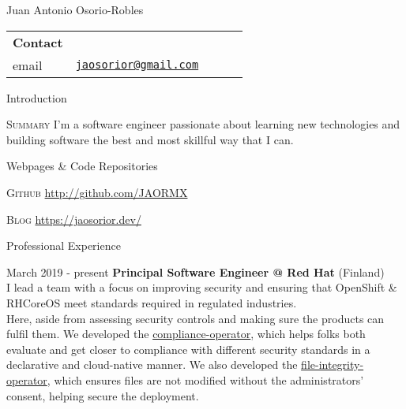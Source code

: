 \documentclass[english,10pt,letterpaper]{article}
\begin{document}
\centering
\begin{cv}{Juan Antonio Osorio-Robles}

	\begin{table}[h]
		\begin{tabular}{@{} l l p{0.5cm} l r}
			{\bf Contact}	&\\
			email & \href{mailto:jaosorior@gmail.com}{\tt jaosorior@gmail.com}\\
		\end{tabular}
	\end{table}

	\begin{cvlist}{Introduction}
        \item[\textsc{Summary}]
            I'm a software engineer passionate about learning new technologies
            and building software the best and most skillful way that I can.
	\end{cvlist}

	\begin{cvlist}{Webpages \& Code Repositories}
        \item [\textsc{Github}]
            \url{http://github.com/JAORMX}

        \item [\textsc{Blog}]
            \url{https://jaosorior.dev/}
	\end{cvlist}

	\begin{cvlist}{Professional Experience}
		\item [March 2019 - present]
            \textbf{Principal Software Engineer @ Red Hat} (Finland)\\
            I lead a team with a focus on improving security and ensuring that
            OpenShift \& RHCoreOS meet standards required in regulated
            industries. \\

            Here, aside from assessing security controls and making sure the
            products can fulfil them. We developed the
            \href{https://github.com/openshift/compliance-operator}{compliance-operator},
            which helps folks both evaluate and get closer to compliance with
            different security standards in a declarative and cloud-native
            manner. We also developed the 
            \href{https://github.com/openshift/file-integrity-operator}{file-integrity-operator},
            which ensures files are not modified without the administrators'
            consent, helping secure the deployment.




\end{cvlist}
\end{cv}
\end{document}
